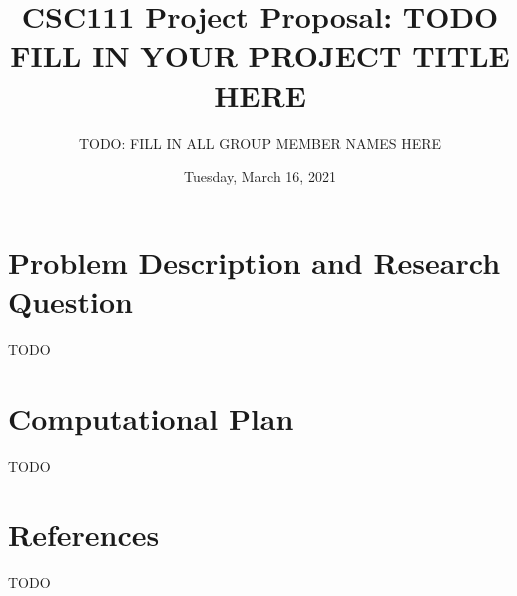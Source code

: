 \documentclass[fontsize=11pt]{article}
\title{CSC111 Project Proposal: TODO FILL IN YOUR PROJECT TITLE HERE}
\author{TODO: FILL IN ALL GROUP MEMBER NAMES HERE}
\date{Tuesday, March 16, 2021}
\begin{document}
\maketitle

\section*{Problem Description and Research Question}

TODO

\section*{Computational Plan}

TODO

\section*{References}

TODO

\end{document}
